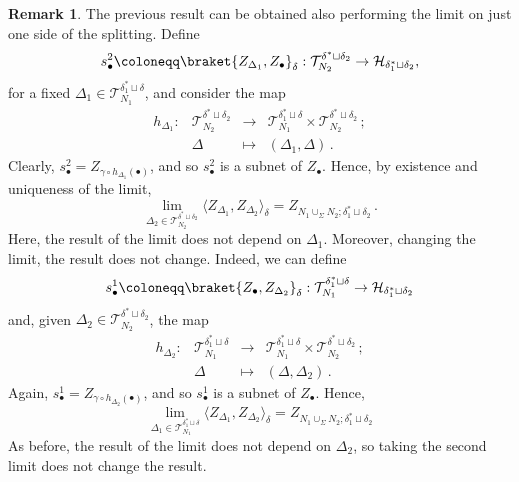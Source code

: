 \documentclass[11pt]{article}
\theoremstyle{definition}
\newtheorem{remark}[proposition]{Remark}
\numberwithin{equation}{section}
\begin{document}
\begin{remark}\label{rmk:loc-ref}
    The previous result can be obtained also performing the limit on just one side of the splitting. Define
\[
s^2_{\bullet}\coloneqq \braket{Z_{\Delta_1},Z_{\bullet}}_\delta:
\mathcal{T}_{N_2}^{\delta^* \sqcup \delta_2}\to \mathcal{H}_{\delta_1^*\sqcup\delta_2},
\]
for a fixed $\Delta_1\in\mathcal{T}_{N_1}^{\delta_1^*\sqcup\delta}$, and consider the map
\begin{equation}
    \begin{matrix}
         h_{\Delta_1}:&\mathcal{T}_{N_2}^{\delta^* \sqcup \delta_2}&\to&\mathcal{T}_{N_1}^{\delta_1^* \sqcup \delta}\times \mathcal{T}_{N_2}^{\delta^* \sqcup \delta_2}\,;\\
    &\Delta &\mapsto &(\Delta_1,\Delta)\,.
    \end{matrix}
\end{equation}
Clearly, $s^2_{\bullet}=Z_{\gamma\circ h_{\Delta_1}(\bullet)}$, and so $s^2_{\bullet}$ is a subnet of $Z_{\bullet}$. Hence, by existence and uniqueness of the limit,
\begin{equation}
    \lim_{\Delta_2\in \mathcal{T}_{N_2}^{\delta^* \sqcup \delta_2}} \langle Z_{\Delta_1},Z_{\Delta_2}\rangle_\delta=Z_{N_1\cup_\Sigma N_2; \delta_1^* \sqcup \delta_2}\,.
\end{equation}
Here, the result of the limit does not depend on $\Delta_1$. Moreover, changing the limit, the result does not change. Indeed, we can define \[s^1_{\bullet}\coloneqq \braket{Z_{\bullet},Z_{\Delta_2}}_\delta:\mathcal{T}_{N_1}^{\delta_1^* \sqcup \delta}\to \mathcal{H}_{\delta_1^*\sqcup\delta_2}\] and, given $\Delta_2\in\mathcal{T}_{N_2}^{\delta^* \sqcup \delta_2}$, the map 
\begin{equation}
    \begin{matrix}
        h_{\Delta_2}:&\mathcal{T}_{N_1}^{\delta_1^* \sqcup \delta}&\to&\mathcal{T}_{N_1}^{\delta_1^* \sqcup \delta}\times \mathcal{T}_{N_2}^{\delta^* \sqcup \delta_2}\,;\\
    &\Delta &\mapsto &(\Delta,\Delta_2)\,.
    \end{matrix}
\end{equation}
Again, $s^1_{\bullet}=Z_{\gamma \circ h_{\Delta_2}(\bullet)}$, and so $s^1_{\bullet}$ is a subnet of $Z_{\bullet}$. Hence,
\begin{equation}
    \lim_{\Delta_1\in \mathcal{T}_{N_1}^{\delta_1^* \sqcup \delta}} \langle Z_{\Delta_1},Z_{\Delta_2}\rangle_\delta=Z_{N_1\cup_\Sigma N_2; \delta_1^* \sqcup \delta_2}
\end{equation}
As before, the result of the limit does not depend on $\Delta_2$, so taking the second limit does not change the result.
\end{remark}
\end{document}
